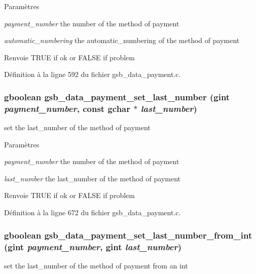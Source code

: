 \begin{DoxyParams}{Paramètres}
\item[{\em payment\_\-number}]the number of the method of payment \item[{\em automatic\_\-numbering}]the automatic\_\-numbering of the method of payment\end{DoxyParams}
\begin{DoxyReturn}{Renvoie}
TRUE if ok or FALSE if problem 
\end{DoxyReturn}


Définition à la ligne 592 du fichier gsb\_\-data\_\-payment.c.

\subsubsection[{gsb\_\-data\_\-payment\_\-set\_\-last\_\-number}]{\setlength{\rightskip}{0pt plus 5cm}gboolean gsb\_\-data\_\-payment\_\-set\_\-last\_\-number (gint {\em payment\_\-number}, \/  const gchar $\ast$ {\em last\_\-number})}\label{gsb__data__payment_8h_a7f9e29b9c638bee6d6a848e8f6968a1e}
set the last\_\-number of the method of payment


\begin{DoxyParams}{Paramètres}
\item[{\em payment\_\-number}]the number of the method of payment \item[{\em last\_\-number}]the last\_\-number of the method of payment\end{DoxyParams}
\begin{DoxyReturn}{Renvoie}
TRUE if ok or FALSE if problem 
\end{DoxyReturn}


Définition à la ligne 672 du fichier gsb\_\-data\_\-payment.c.

\subsubsection[{gsb\_\-data\_\-payment\_\-set\_\-last\_\-number\_\-from\_\-int}]{\setlength{\rightskip}{0pt plus 5cm}gboolean gsb\_\-data\_\-payment\_\-set\_\-last\_\-number\_\-from\_\-int (gint {\em payment\_\-number}, \/  gint {\em last\_\-number})}\label{gsb__data__payment_8h_aa96739efe92d5ba723d24e45ef9f9f6a}
set the last\_\-number of the method of payment from an int


